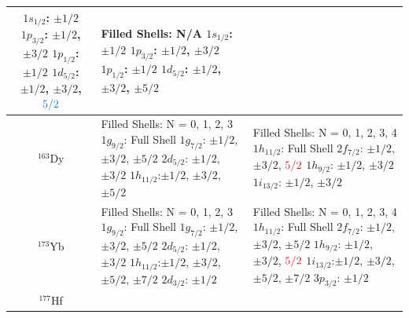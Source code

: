 \documentclass[10pt,a4paper, twoside, openright]{report}
\begin{document}
\begin{longtable}{cll}
{    $1s_{1/2}$: $\pm 1/2$ \\
    $1p_{3/2}$: $\pm 1/2$, $\pm 3/2$ \\
    $1p_{1/2}$: $\pm 1/2$ \\
    $1d_{5/2}$: $\pm 1/2$, $\pm 3/2$, $\textcolor{RoyalBlue}{5/2}$}              
    &  \pbox{20cm}{Filled Shells: N/A \\
    $1s_{1/2}$: $\pm 1/2$ \\
    $1p_{3/2}$: $\pm 1/2$, $\pm 3/2$ \\
    $1p_{1/2}$: $\pm 1/2$ \\
    $1d_{5/2}$: $\pm 1/2$, $\pm 3/2$, $\pm 5/2$}\\
\midrule
$^{163}$Dy 
    &  \pbox{20cm}{Filled Shells: N = 0, 1, 2, 3 \\
    $1g_{9/2}$: Full Shell \\
    $1g_{7/2}$: $\pm 1/2$, $\pm 3/2$, $\pm 5/2$ \\
    $2d_{5/2}$: $\pm 1/2$, $\pm 3/2$ \\
    $1h_{11/2}$:$\pm 1/2$, $\pm 3/2$, $\pm 5/2$}              
    &  \pbox{20cm}{Filled Shells: N = 0, 1, 2, 3, 4 \\
    $1h_{11/2}$: Full Shell \\
    $2f_{7/2}$: $\pm 1/2$, $\pm 3/2$, $\textcolor{BrickRed}{5/2}$ \\
    $1h_{9/2}$: $\pm 1/2$, $\pm 3/2$ \\
    $1i_{13/2}$: $\pm 1/2$, $\pm 3/2$} \\
\midrule
$^{173}$Yb 
    &  \pbox{20cm}{Filled Shells: N = 0, 1, 2, 3 \\
    $1g_{9/2}$: Full Shell \\
    $1g_{7/2}$: $\pm 1/2$, $\pm 3/2$, $\pm 5/2$ \\
    $2d_{5/2}$: $\pm 1/2$, $\pm 3/2$ \\
    $1h_{11/2}$:$\pm 1/2$, $\pm 3/2$, $\pm 5/2$, $\pm 7/2$ \\
    $2d_{3/2}$: $\pm 1/2$}              
    &  \pbox{20cm}{Filled Shells: N = 0, 1, 2, 3, 4 \\
    $1h_{11/2}$: Full Shell \\
    $2f_{7/2}$: $\pm 1/2$, $\pm 3/2$, $\pm 5/2$ \\
    $1h_{9/2}$: $\pm 1/2$, $\pm 3/2$, $\textcolor{BrickRed}{5/2}$ \\
    $1i_{13/2}$:$\pm 1/2$, $\pm 3/2$, $\pm 5/2$, $\pm 7/2$ \\
    $3p_{3/2}$: $\pm 1/2$} \\
\midrule
$^{177}$Hf 

\end{longtable}
\end{document}
